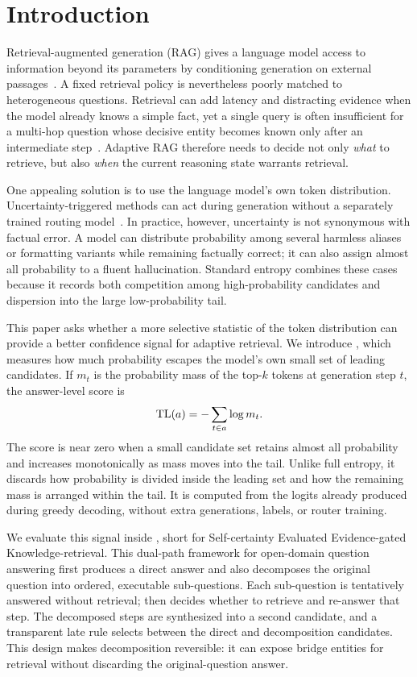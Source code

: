 \section{Introduction}
\label{sec:introduction}

Retrieval-augmented generation (RAG) gives a language model access to
information beyond its parameters by conditioning generation on external
passages~\citep{rag_survey}. A fixed retrieval policy is nevertheless poorly
matched to heterogeneous questions. Retrieval can add latency and distracting
evidence when the model already knows a simple fact, yet a single query is
often insufficient for a multi-hop question whose decisive entity becomes
known only after an intermediate step~\citep{ircot,ren2023}. Adaptive RAG
therefore needs to decide not only \emph{what} to retrieve, but also
\emph{when} the current reasoning state warrants retrieval.

One appealing solution is to use the language model's own token distribution.
Uncertainty-triggered methods can act during generation without a separately
trained routing model~\citep{flare,dragin,targ}. In practice, however,
uncertainty is not synonymous with factual error. A model can distribute
probability among several harmless aliases or formatting variants while
remaining factually correct; it can also assign almost all probability to a
fluent hallucination. Standard entropy combines these cases because it records
both competition among high-probability candidates and dispersion into the
large low-probability tail.

This paper asks whether a more selective statistic of the token distribution
can provide a better confidence signal for adaptive retrieval. We introduce
\tailleak{}, which measures how much probability escapes the model's
own small set of leading candidates. If \(m_t\) is the probability mass of the
top-\(k\) tokens at generation step \(t\), the answer-level score is
\[
    \mathrm{TL}(a)=-\sum_{t\in a}\log m_t.
\]
The score is near zero when a small candidate set retains almost all
probability and increases monotonically as mass moves into the tail. Unlike
full entropy, it discards how probability is divided inside the leading set
and how the remaining mass is arranged within the tail. It is computed from
the logits already produced during greedy decoding, without extra generations,
labels, or router training.

We evaluate this signal inside \method{}, short for Self-certainty Evaluated
Evidence-gated Knowledge-retrieval. This dual-path framework for open-domain
question answering first
produces a direct answer and also decomposes the original question into
ordered, executable sub-questions. Each sub-question is tentatively answered
without retrieval; \tailleak{} then decides whether to retrieve and re-answer
that step. The decomposed steps are synthesized into a second candidate, and a
transparent late rule selects between the direct and decomposition candidates.
This design makes decomposition reversible: it can expose bridge entities for
retrieval without discarding the original-question answer.


